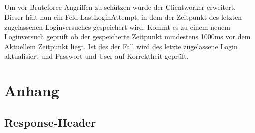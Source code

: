 \documentclass[12pt]{article}
\theoremstyle{plain}
\begin{document}
\subsection{}
Um vor Bruteforce Angriffen zu schützen wurde der Clientworker erweitert. Dieser hält nun ein Feld LastLoginAttempt, in dem der Zeitpunkt des letzten zugelassenen Loginversuches gespeichert wird. Kommt es zu einem neuem Loginversuch geprüft ob der gespeicherte Zeitpunkt mindestens 1000ms vor dem Aktuellem Zeitpunkt liegt. Ist des der Fall wird des letzte zugelassene Login aktualisiert und Passwort und User auf Korrektheit geprüft.
\section{Anhang}
\subsection{Response-Header}
\end{document}
